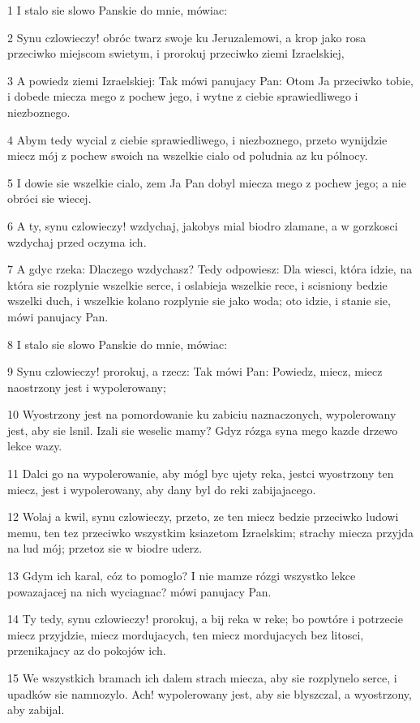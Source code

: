 \par 1 I stalo sie slowo Panskie do mnie, mówiac:
\par 2 Synu czlowieczy! obróc twarz swoje ku Jeruzalemowi, a krop jako rosa przeciwko miejscom swietym, i prorokuj przeciwko ziemi Izraelskiej,
\par 3 A powiedz ziemi Izraelskiej: Tak mówi panujacy Pan: Otom Ja przeciwko tobie, i dobede miecza mego z pochew jego, i wytne z ciebie sprawiedliwego i niezboznego.
\par 4 Abym tedy wycial z ciebie sprawiedliwego, i niezboznego, przeto wynijdzie miecz mój z pochew swoich na wszelkie cialo od poludnia az ku pólnocy.
\par 5 I dowie sie wszelkie cialo, zem Ja Pan dobyl miecza mego z pochew jego; a nie obróci sie wiecej.
\par 6 A ty, synu czlowieczy! wzdychaj, jakobys mial biodro zlamane, a w gorzkosci wzdychaj przed oczyma ich.
\par 7 A gdyc rzeka: Dlaczego wzdychasz? Tedy odpowiesz: Dla wiesci, która idzie, na która sie rozplynie wszelkie serce, i oslabieja wszelkie rece, i scisniony bedzie wszelki duch, i wszelkie kolano rozplynie sie jako woda; oto idzie, i stanie sie, mówi panujacy Pan.
\par 8 I stalo sie slowo Panskie do mnie, mówiac:
\par 9 Synu czlowieczy! prorokuj, a rzecz: Tak mówi Pan: Powiedz, miecz, miecz naostrzony jest i wypolerowany;
\par 10 Wyostrzony jest na pomordowanie ku zabiciu naznaczonych, wypolerowany jest, aby sie lsnil. Izali sie weselic mamy? Gdyz rózga syna mego kazde drzewo lekce wazy.
\par 11 Dalci go na wypolerowanie, aby mógl byc ujety reka, jestci wyostrzony ten miecz, jest i wypolerowany, aby dany byl do reki zabijajacego.
\par 12 Wolaj a kwil, synu czlowieczy, przeto, ze ten miecz bedzie przeciwko ludowi memu, ten tez przeciwko wszystkim ksiazetom Izraelskim; strachy miecza przyjda na lud mój; przetoz sie w biodre uderz.
\par 13 Gdym ich karal, cóz to pomoglo? I nie mamze rózgi wszystko lekce powazajacej na nich wyciagnac? mówi panujacy Pan.
\par 14 Ty tedy, synu czlowieczy! prorokuj, a bij reka w reke; bo powtóre i potrzecie miecz przyjdzie, miecz mordujacych, ten miecz mordujacych bez litosci, przenikajacy az do pokojów ich.
\par 15 We wszystkich bramach ich dalem strach miecza, aby sie rozplynelo serce, i upadków sie namnozylo. Ach! wypolerowany jest, aby sie blyszczal, a wyostrzony, aby zabijal.
